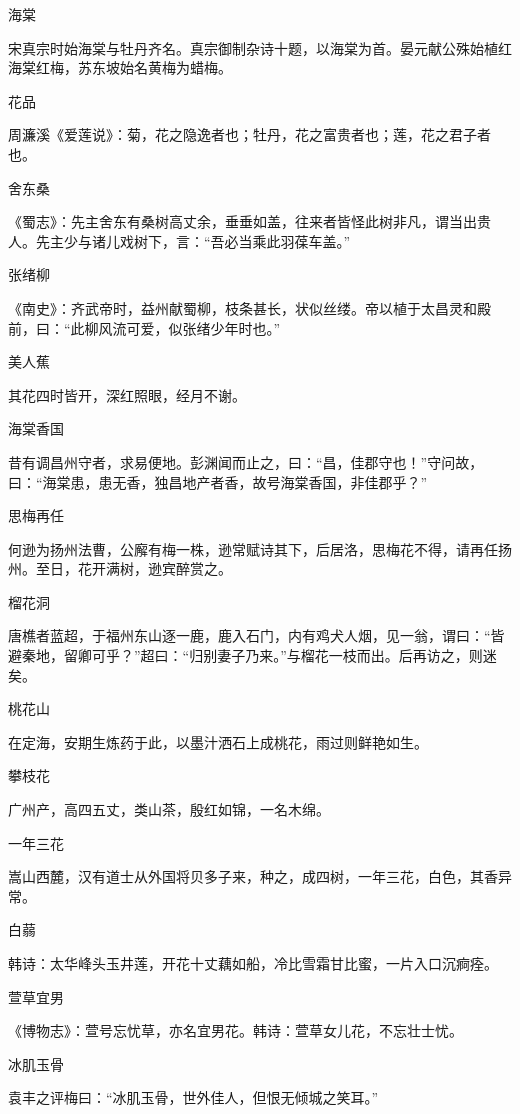 \documentclass[a4paper,12pt,UTF8,twoside]{ctexbook}
\begin{document}
    海棠
    
    宋真宗时始海棠与牡丹齐名。真宗御制杂诗十题，以海棠为首。晏元献公殊始植红海棠红梅，苏东坡始名黄梅为蜡梅。
    
    花品
    
    周濂溪《爱莲说》：菊，花之隐逸者也；牡丹，花之富贵者也；莲，花之君子者也。
    
    舍东桑
    
    《蜀志》：先主舍东有桑树高丈余，垂垂如盖，往来者皆怪此树非凡，谓当出贵人。先主少与诸儿戏树下，言：“吾必当乘此羽葆车盖。”
    
    张绪柳
    
    《南史》：齐武帝时，益州献蜀柳，枝条甚长，状似丝缕。帝以植于太昌灵和殿前，曰：“此柳风流可爱，似张绪少年时也。”
    
    美人蕉
    
    其花四时皆开，深红照眼，经月不谢。
    
    海棠香国
    
    昔有调昌州守者，求易便地。彭渊闻而止之，曰：“昌，佳郡守也！”守问故，曰：“海棠患，患无香，独昌地产者香，故号海棠香国，非佳郡乎？”
    
    思梅再任
    
    何逊为扬州法曹，公廨有梅一株，逊常赋诗其下，后居洛，思梅花不得，请再任扬州。至日，花开满树，逊宾醉赏之。
    
    榴花洞
    
    唐樵者蓝超，于福州东山逐一鹿，鹿入石门，内有鸡犬人烟，见一翁，谓曰：“皆避秦地，留卿可乎？”超曰：“归别妻子乃来。”与榴花一枝而出。后再访之，则迷矣。
    
    桃花山
    
    在定海，安期生炼药于此，以墨汁洒石上成桃花，雨过则鲜艳如生。
    
    攀枝花
    
    广州产，高四五丈，类山茶，殷红如锦，一名木绵。
    
    一年三花
    
    嵩山西麓，汉有道士从外国将贝多子来，种之，成四树，一年三花，白色，其香异常。
    
    白蒻
    
    韩诗：太华峰头玉井莲，开花十丈藕如船，冷比雪霜甘比蜜，一片入口沉痾痊。
    
    萱草宜男
    
    《博物志》：萱号忘忧草，亦名宜男花。韩诗：萱草女儿花，不忘壮士忧。
    
    冰肌玉骨
    
    袁丰之评梅曰：“冰肌玉骨，世外佳人，但恨无倾城之笑耳。”
    
\end{document}
